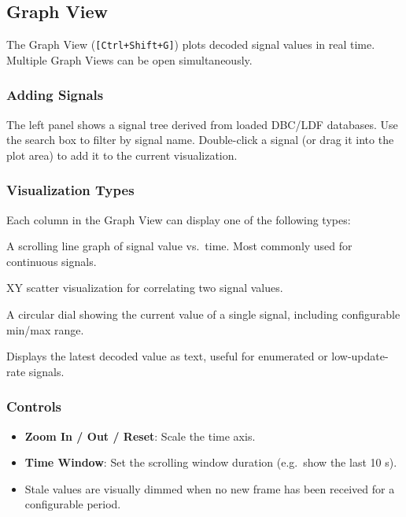 \documentclass[a4paper,11pt]{article}
\newcommand{\key}[1]{\texttt{\small[#1]}}
\newcommand{\ui}[1]{\textbf{#1}}
\begin{document}
\subsection{Graph View}
\label{sec:graph}

The Graph View (\key{Ctrl+Shift+G}) plots decoded signal values in real time.
Multiple Graph Views can be open simultaneously.

\subsubsection{Adding Signals}

The left panel shows a signal tree derived from loaded DBC/LDF databases.
Use the search box to filter by signal name. Double-click a signal (or drag it into
the plot area) to add it to the current visualization.

\subsubsection{Visualization Types}

Each column in the Graph View can display one of the following types:

\begin{description}[leftmargin=2em, style=nextline]
  \item[Time Series] A scrolling line graph of signal value vs.\ time. Most
        commonly used for continuous signals.
  \item[Scatter Plot] XY scatter visualization for correlating two signal values.
  \item[Gauge] A circular dial showing the current value of a single signal,
        including configurable min/max range.
  \item[Text] Displays the latest decoded value as text, useful for enumerated
        or low-update-rate signals.
\end{description}

\subsubsection{Controls}

\begin{itemize}
  \item \ui{Zoom In / Out / Reset}: Scale the time axis.
  \item \ui{Time Window}: Set the scrolling window duration (e.g.\ show the last 10 s).
  \item Stale values are visually dimmed when no new frame has been received for a
        configurable period.
\end{itemize}
\end{document}
